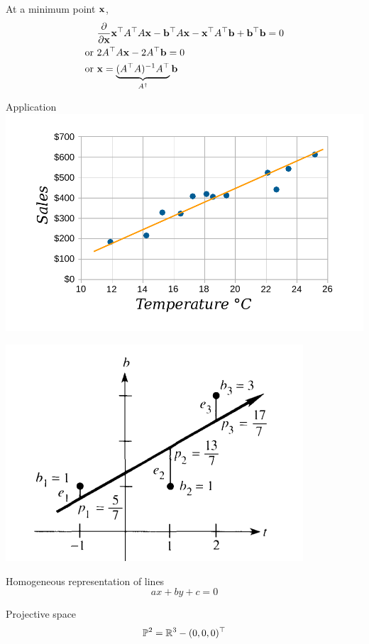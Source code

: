 \documentclass[times]{beamer}
\begin{document}
  \begin{frame}
    At a minimum point $\mathbf{x}$,
    \begin{align}
     &\frac{\partial }{\partial \mathbf{x}} \mathbf{x}^\top A^\top A\mathbf{x} - \mathbf{b}^\top A\mathbf{x} - \mathbf{x}^\top A^\top \mathbf{b} + \mathbf{b}^\top \mathbf{b} = 0
       \\
      \text{or } & 2A^\top A\mathbf{x} - 2 A^\top \mathbf{b} = 0
      \\
      \text{or } & \mathbf{x} = \underbrace{(A^\top A)^{-1} A^\top}_{A^\dagger} \mathbf{b}
    \end{align}
  \end{frame}

  \begin{frame}{Application }
    \includegraphics[width=\linewidth]{media/scatter-plot.pdf}
  \end{frame}
  \begin{frame}
    \includegraphics[width=0.5\linewidth]{media/straight-line-approx-gilbert-strang.png}
 \end{frame}


  \begin{frame}{Homogeneous representation of lines}
    \[ ax + by + c = 0\]
  \end{frame}

  \begin{frame}{Projective space}
    \[ \mathbb{P}^2 = \mathbb{R}^3 - (0, 0, 0)^\top \]
    \end{frame}
\end{document}
